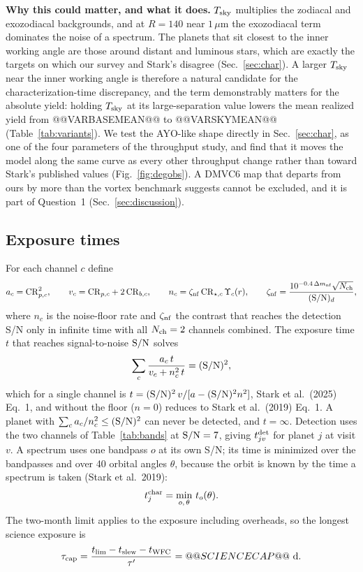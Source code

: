 \documentclass[11pt,a4paper]{article}
\begin{document}
\textbf{Why this could matter, and what it does.} $T_{\rm sky}$ multiplies the zodiacal and
exozodiacal backgrounds, and at $R = 140$ near $1\,\mu$m the exozodiacal term dominates the noise
of a spectrum. The planets that sit closest to the inner working angle are those around distant
and luminous stars, which are exactly the targets on which our survey and Stark's disagree
(Sec.~\ref{sec:char}). A larger $T_{\rm sky}$ near the inner working angle is therefore a natural
candidate for the characterization-time discrepancy, and the term demonstrably matters for the
absolute yield: holding $T_{\rm sky}$ at its large-separation value lowers the mean realized yield
from @@VARBASEMEAN@@ to @@VARSKYMEAN@@ (Table~\ref{tab:variants}). We test the AYO-like shape
directly in Sec.~\ref{sec:char}, as one of the four parameters of the throughput study, and find
that it moves the model along the same curve as every other throughput change rather than toward
Stark's published values (Fig.~\ref{fig:degobs}). A DMVC6 map that departs from ours by more than
the vortex benchmark suggests cannot be excluded, and it is part of Question~1
(Sec.~\ref{sec:discussion}).

\subsection{Exposure times}

For each channel $c$ define
\[
a_c = \mathrm{CR}_{p,c}^2, \qquad v_c = \mathrm{CR}_{p,c} + 2\,\mathrm{CR}_{b,c}, \qquad
n_c = \zeta_{\rm nf}\,\mathrm{CR}_{\star,c}\,\Upsilon_c(r), \qquad
\zeta_{\rm nf} = \frac{10^{-0.4\,\Delta m_{\rm nf}}\sqrt{N_{\rm ch}}}{({\rm S/N})_d},
\]
where $n_c$ is the noise-floor rate and $\zeta_{\rm nf}$ the contrast that reaches the detection S/N only in infinite time with all $N_{\rm ch} = 2$
channels combined. The
exposure time $t$ that reaches signal-to-noise ${\rm S/N}$ solves
\begin{equation}
\sum_c \frac{a_c\,t}{v_c + n_c^2\,t} = ({\rm S/N})^2,
\label{eq:exptime}
\end{equation}
which for a single channel is
$t = ({\rm S/N})^2\,v/[a - ({\rm S/N})^2 n^2]$, Stark et al.\ (2025) Eq.~1, and without the
floor ($n = 0$) reduces to Stark et al.\ (2019) Eq.~1. A planet with
$\sum_c a_c/n_c^2 \le ({\rm S/N})^2$ can never be detected, and $t = \infty$. Detection uses the
two channels of Table~\ref{tab:bands} at ${\rm S/N} = 7$, giving $t^{\rm det}_{jv}$ for planet $j$
at visit $v$. A spectrum uses one bandpass $o$ at its own S/N; its time is minimized over the
bandpasses and over 40 orbital angles $\theta$, because the orbit is known by the time a spectrum
is taken (Stark et al.\ 2019):
\begin{equation}
t^{\rm char}_j = \min_{o,\,\theta}\,t_o(\theta).
\label{eq:tchar}
\end{equation}
The two-month limit applies to the exposure including overheads, so the longest science exposure
is
\begin{equation}
\tau_{\rm cap} = \frac{t_{\rm lim} - t_{\rm slew} - t_{\rm WFC}}{\tau'} = @@SCIENCECAP@@\ {\rm d}.
\label{eq:cap}
\end{equation}
\end{document}
